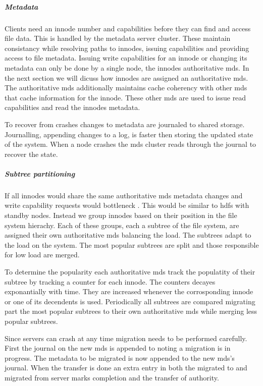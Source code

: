 \subparagraph{Metadata}
Clients need an innode number and capabilities before they can find and access file data. This is handled by the metadata server cluster. These maintain consistancy while resolving paths to innodes, issuing capabilities and providing access to file metadata. Issuing write capabilities for an innode or changing its metadata can only be done  by a single node, the innodes authoritative \ac{mds}. In the next section we will dicuss how innodes are assigned an authoritative \ac{mds}. The authoritative \ac{mds} additionally maintains cache coherency with other \ac{mds} that cache information for the innode. These other \ac{mds} are used to issue read capabilities and read the innodes metadata.

To recover from crashes changes to metadata are journaled to shared storage. Journalling, appending changes to a log, is faster then storing the updated state of the system. When a node crashes the \ac{mds} cluster reads through the journal to recover the state.

\subparagraph{Subtree partitioning}
If all innodes would share the same authoritative \ac{mds} metadata changes and write capability requests would bottleneck . This would be similar to \ac{hdfs} with standby nodes. Instead we group innodes based on their position in the file system hierachy. Each of these groups, each a subtree of the file system, are assigned their own authoritative \ac{mds} balancing the load. The subtrees adapt to the load on the system. The most popular subtrees are split and those responsible for low load are merged.

To determine the popularity each authoritative \ac{mds} track the populatity of their subtree by tracking a counter for each innode. The counters decayes exponantially with time. They are increased whenever the corrosponding innode or one of its decendents is used. Periodically all subtrees are compared migrating part the most popular subtrees to their own authoritative \ac{mds} while merging less popular subtrees.

Since servers can crash at any time migration needs to be performed carefully. First the journal on the new \ac{mds} is appended to noting a migration is in progress. The metadata to be migrated is now appended to the new \ac{mds}'s journal. When the transfer is done an extra entry in both the migrated to and migrated from server marks completion and the transfer of authority. 

